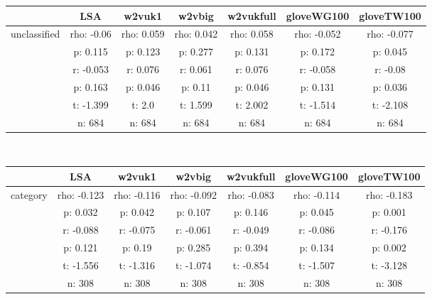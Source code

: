 \documentclass{article}
\begin{document}
\begin{tabular}{ccccccc|}\cline{2-7}
&\multicolumn{1}{|c}{LSA} & w2vuk1 & w2vbig & w2vukfull & gloveWG100 & gloveTW100 \\\hline
\multicolumn{1}{|c|}{\multirow{6}{*}{unclassified}} & rho: -0.06 & rho: 0.059 & rho: 0.042 & rho: 0.058 & rho: -0.052 & rho: -0.077 \\
\multicolumn{1}{|c|}{} & p: 0.115 & p: 0.123 & p: 0.277 & p: 0.131 & p: 0.172 & p: 0.045 \\
\multicolumn{1}{|c|}{} & r: -0.053 & r: 0.076 & r: 0.061 & r: 0.076 & r: -0.058 & r: -0.08 \\
\multicolumn{1}{|c|}{} & p: 0.163 & p: 0.046 & p: 0.11 & p: 0.046 & p: 0.131 & p: 0.036 \\
\multicolumn{1}{|c|}{} & t: -1.399 & t: 2.0 & t: 1.599 & t: 2.002 & t: -1.514 & t: -2.108 \\
\multicolumn{1}{|c|}{} & n: 684 & n: 684 & n: 684 & n: 684 & n: 684 & n: 684 \\
\hline
\end{tabular}\\
\begin{tabular}{ccccccc|}\cline{2-7}
&\multicolumn{1}{|c}{LSA} & w2vuk1 & w2vbig & w2vukfull & gloveWG100 & gloveTW100 \\\hline
\multicolumn{1}{|c|}{\multirow{6}{*}{category}} & rho: -0.123 & rho: -0.116 & rho: -0.092 & rho: -0.083 & rho: -0.114 & rho: -0.183 \\
\multicolumn{1}{|c|}{} & p: 0.032 & p: 0.042 & p: 0.107 & p: 0.146 & p: 0.045 & p: 0.001 \\
\multicolumn{1}{|c|}{} & r: -0.088 & r: -0.075 & r: -0.061 & r: -0.049 & r: -0.086 & r: -0.176 \\
\multicolumn{1}{|c|}{} & p: 0.121 & p: 0.19 & p: 0.285 & p: 0.394 & p: 0.134 & p: 0.002 \\
\multicolumn{1}{|c|}{} & t: -1.556 & t: -1.316 & t: -1.074 & t: -0.854 & t: -1.507 & t: -3.128 \\
\multicolumn{1}{|c|}{} & n: 308 & n: 308 & n: 308 & n: 308 & n: 308 & n: 308 \\
\hline
\end{tabular}\\
\end{document}
